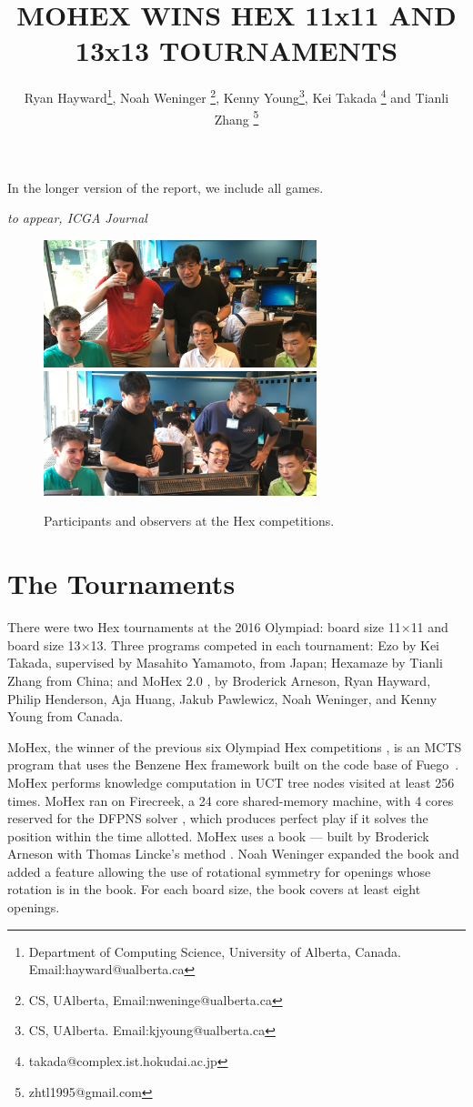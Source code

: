 \documentclass{icga}
\title{\sc MOHEX WINS HEX 11x11 AND 13x13 TOURNAMENTS}
\author{Ryan Hayward\thanks{Department 
of Computing Science, University of Alberta, Canada. Email:hayward@ualberta.ca},
Noah Weninger \thanks{CS, UAlberta, Email:nweninge@ualberta.ca},
Kenny Young\thanks{CS, UAlberta. Email:kjyoung@ualberta.ca},
Kei Takada \thanks{takada@complex.ist.hokudai.ac.jp} and
Tianli Zhang \thanks{zhtl1995@gmail.com}
}
\affiliation{Edmonton, Canada}
\newif\iflong\longtrue  %
\def\Eo{\mbox{\sc Ezo}}
\def\Hz{\mbox{\sc Hexamaze}}
\def\Mx{\mbox{\sc MoHex}}
\def\Fuego{\mbox{\sc Fuego}}
\begin{document}
\maketitle

\iflong
In the longer version of the report, we include all games.
\fi

\vspace*{-2.25in}
{\it to appear, ICGA Journal}
\vspace*{2.0in}

\begin{figure}[hbt]
\includegraphics[width=225pt]{photos/pick.eps}\
\includegraphics[width=225pt]{photos/picr.eps}
\caption{Participants and observers at the Hex competitions.}
\end{figure}

\section{The Tournaments}
There were two Hex tournaments at the 2016 Olympiad:
board size 11$\times$11 and board size 13$\times$13.
Three programs competed in each tournament:
\Eo{} by Kei Takada, supervised by Masahito Yamamoto, from Japan;
\Hz{} by Tianli Zhang from China; and
\Mx{} 2.0 , 
by Broderick Arneson, Ryan Hayward, Philip Henderson, Aja Huang, 
Jakub Pawlewicz, Noah Weninger, and Kenny Young from Canada.

\Mx{}, the winner of the previous six Olympiad Hex competitions
,
is an MCTS program that uses the Benzene Hex framework
built on the code base of \Fuego\ .
\Mx{} performs knowledge computation in UCT tree nodes visited at least 256 times.
\Mx{} ran on Firecreek, a 24 core shared-memory machine, 
with 4 cores reserved for the 
DFPNS solver , which
produces perfect play if it solves the
position within the time allotted.
\Mx{} uses a book ---
built by Broderick Arneson with Thomas Lincke's method 
. 
Noah Weninger expanded the book and added a feature
allowing the use of rotational symmetry for openings
whose rotation is in the book.
For each board size, the book covers at least eight openings.
\end{document}
